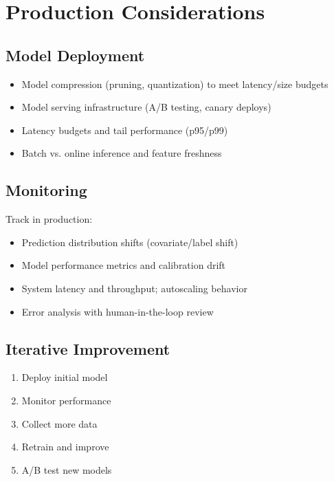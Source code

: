 
\section{Production Considerations}
\label{sec:production}

\subsection{Model Deployment}

\begin{itemize}
    \item Model compression (pruning, quantization) to meet latency/size budgets
    \item Model serving infrastructure (A/B testing, canary deploys)
    \item Latency budgets and tail performance (p95/p99)
    \item Batch vs. online inference and feature freshness
\end{itemize}

\subsection{Monitoring}

Track in production:
\begin{itemize}
    \item Prediction distribution shifts (covariate/label shift) 
    \item Model performance metrics and calibration drift
    \item System latency and throughput; autoscaling behavior
    \item Error analysis with human-in-the-loop review
\end{itemize}

\subsection{Iterative Improvement}

\begin{enumerate}
    \item Deploy initial model
    \item Monitor performance
    \item Collect more data
    \item Retrain and improve
    \item A/B test new models
\end{enumerate}

